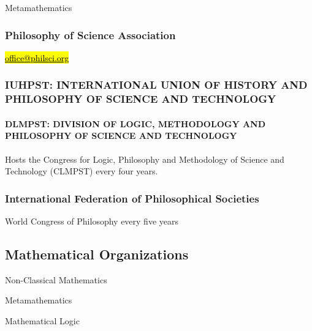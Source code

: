 Metamathematics

\hypertarget{philosophy-of-science-association}{%
\subsubsection{\texorpdfstring{Philosophy of Science Association
}{Philosophy of Science Association }}\label{philosophy-of-science-association}}

\href{mailto:office@philsci.org}{\hl{\ul{office@philsci.org}}}

\hypertarget{iuhpst-international-union-of-history-and-philosophy-of-science-and-technology}{%
\subsubsection{IUHPST: INTERNATIONAL UNION OF HISTORY AND PHILOSOPHY OF
SCIENCE AND
TECHNOLOGY}\label{iuhpst-international-union-of-history-and-philosophy-of-science-and-technology}}

\hypertarget{dlmpst-division-of-logic-methodology-and-philosophy-of-science-and-technology}{%
\paragraph{DLMPST: DIVISION OF LOGIC, METHODOLOGY AND PHILOSOPHY OF
SCIENCE AND
TECHNOLOGY}\label{dlmpst-division-of-logic-methodology-and-philosophy-of-science-and-technology}}

Hosts the Congress for Logic, Philosophy and Methodology of Science and
Technology (CLMPST) every four years.

\hypertarget{international-federation-of-philosophical-societies}{%
\subsubsection{International Federation of Philosophical
Societies}\label{international-federation-of-philosophical-societies}}

World Congress of Philosophy every five years

\hypertarget{mathematical-organizations}{%
\subsection{Mathematical
Organizations}\label{mathematical-organizations}}

Non-Classical Mathematics

Metamathematics

Mathematical Logic

